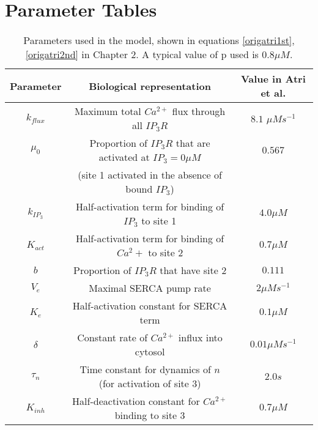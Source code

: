\chapter{Parameter Tables}

\begin{table}[!htb]
\begin{center}
\begin{tabular}{ c c c }
 Parameter & Biological representation & Value in Atri et al. \\
 \hline
 $k_{flux}$ & Maximum total $Ca^{2+}$ flux through all $IP_3R$ & $8.1$ {$\mu M s^{-1} $}\\
 \hline
 $\mu_0$ & Proportion of $IP_3R$ that are activated at $IP_3=0 \mu M$ & $0.567$\\
 &(site 1 activated in the absence of bound $IP_3$) &\\
 \hline
 $k_{IP_3}$ & Half-activation term for binding of $IP_3$ to site 1 & $4.0\mu M$ \\
 \hline
 $K_{act}$ & Half-activation term for binding of $Ca^2+$ to site 2 & $0.7 \mu M$ \\
 \hline
 $b$ & Proportion of $IP_3R$ that have site 2 & $0.111$ \\
 \hline
 $V_e$ & Maximal SERCA pump rate & $2 \mu Ms^{-1}$\\
 \hline
 $K_e$ & Half-activation constant for SERCA term & $0.1 \mu M $\\
 \hline
 {$\delta$} & Constant rate of $Ca^{2+}$ influx into cytosol & $0.01 \mu Ms^{-1}$ \\
 \hline
 $\tau_n$ & Time constant for dynamics of $n$ (for activation of site 3) & $2.0 s$\\
 \hline
 $K_{inh}$ & Half-deactivation constant for $Ca^{2+}$ binding to site 3 & $0.7 \mu M$\\
\end{tabular}
\end{center}
\caption{Parameters used in the  model, shown in equations \eqref{origatri1st}, \eqref{origatri2nd} in Chapter 2. {A typical value of p used is $0.8 \mu M$.}}\label{origatriparam}
\end{table}

